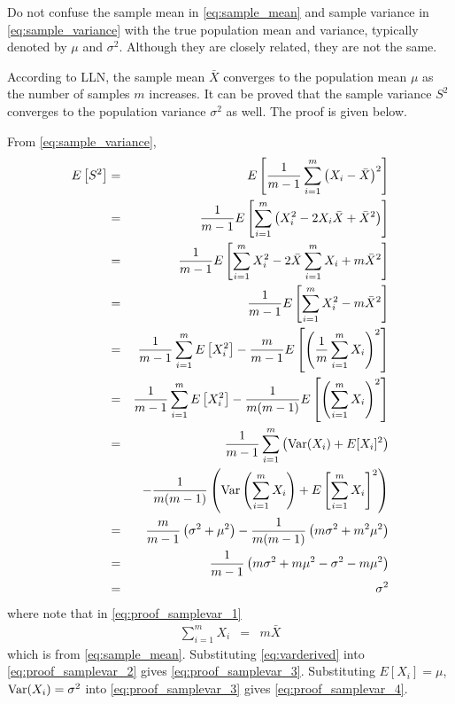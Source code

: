 Do not confuse the sample mean in \eqref{eq:sample_mean} and sample variance in \eqref{eq:sample_variance} with the true population mean and variance, typically denoted by $\mu$ and $\sigma^2$. Although they are closely related, they are not the same.

According to LLN, the sample mean $\bar{X}$ converges to the population mean $\mu$ as the number of samples $m$ increases. It can be proved that the sample variance $S^2$ converges to the population variance $\sigma^2$ as well. The proof is given below.

From \eqref{eq:sample_variance},
\begin{eqnarray}
	E\left[S^2\right] &=& E\left[\dfrac{1}{m-1}\sum_{i=1}^{m}\left(X_i - \bar{X}\right)^2\right] \nonumber \\
	&=& \dfrac{1}{m-1} E\left[\sum_{i=1}^{m}\left(X_i^2 - 2X_i\bar{X} + \bar{X}^2\right)\right]  \nonumber \\
	&=& \dfrac{1}{m-1} E\left[\sum_{i=1}^{m}X_i^2 - 2\bar{X}\sum_{i=1}^{m}X_i + m\bar{X}^2\right] \label{eq:proof_samplevar_1} \\
	&=& \dfrac{1}{m-1} E\left[\sum_{i=1}^{m}X_i^2 - m\bar{X}^2\right] \nonumber \\
	&=& \dfrac{1}{m-1}\sum_{i=1}^{m} E\left[X_i^2\right] - \dfrac{m}{m-1}E\left[\left(\dfrac{1}{m}\sum_{i=1}^{m}X_i\right)^2\right] \nonumber \\
	&=& \dfrac{1}{m-1}\sum_{i=1}^{m} E\left[X_i^2\right] - \dfrac{1}{m(m-1)}E\left[\left(\sum_{i=1}^{m}X_i\right)^2\right] \label{eq:proof_samplevar_2} \\
	&=& \dfrac{1}{m-1}\sum_{i=1}^{m} \left(\textup{Var}(X_i) + E[X_i]^2\right) \nonumber \\ && -  \dfrac{1}{m(m-1)}\left(\textup{Var}\left(\sum_{i=1}^{m}X_i\right) + E\left[\sum_{i=1}^{m}X_i\right]^2\right) \label{eq:proof_samplevar_3} \\
	&=& \dfrac{m}{m-1}\left(\sigma^2 + \mu^2\right) - \dfrac{1}{m(m-1)}\left(m\sigma^2 + m^2\mu^2\right) \label{eq:proof_samplevar_4} \\
	&=& \dfrac{1}{m-1}\left(m\sigma^2 + m\mu^2 - \sigma^2 - m\mu^2\right) \nonumber \\
	&=& \sigma^2 \nonumber
\end{eqnarray}
where note that in \eqref{eq:proof_samplevar_1} 
\begin{eqnarray}
	\sum_{i=1}^{m}X_i &=& m\bar{X} \nonumber
\end{eqnarray}
which is from \eqref{eq:sample_mean}. Substituting \eqref{eq:varderived} into \eqref{eq:proof_samplevar_2} gives \eqref{eq:proof_samplevar_3}. Substituting $E[X_i] = \mu$, $\textup{Var}(X_i) = \sigma^2$ into \eqref{eq:proof_samplevar_3} gives \eqref{eq:proof_samplevar_4}. 

